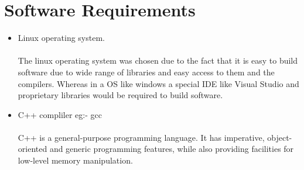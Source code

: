 \documentclass{scrreprt}
\begin{document}
\section{Software Requirements}
\begin{itemize}
    \item Linux operating system.
    \\
    \\The linux operating system was chosen due to the fact that it is easy to build software due to wide range of libraries and easy access to them and the compilers. Whereas in a OS like windows a special IDE like Visual Studio and proprietary libraries would be required to build software.
    \item C++ compliler eg:- gcc
    \\
    \\C++ is a general-purpose programming language. It has imperative, object-oriented and generic programming features, while also providing facilities for low-level memory manipulation.


\end{itemize}
\end{document}
